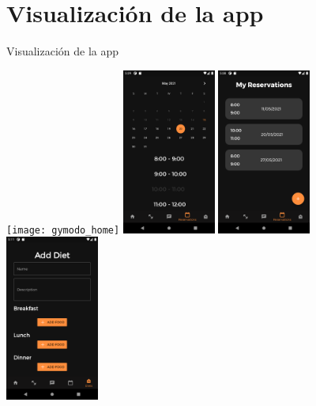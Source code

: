 \documentclass[12pt]{beamer}
\begin{document}
\section{Visualización de la app}
\begin{frame}{Visualización de la app}

\begin{center}
\texttt{[image: gymodo\_home]}
\includegraphics[width=0.23\textwidth]{gymodo_create_reservation}
\includegraphics[width=0.23\textwidth]{gymodo_your_reservations}
\includegraphics[width=0.23\textwidth]{gymodo_add_diet}
\end{center}

\end{frame}
\end{document}
